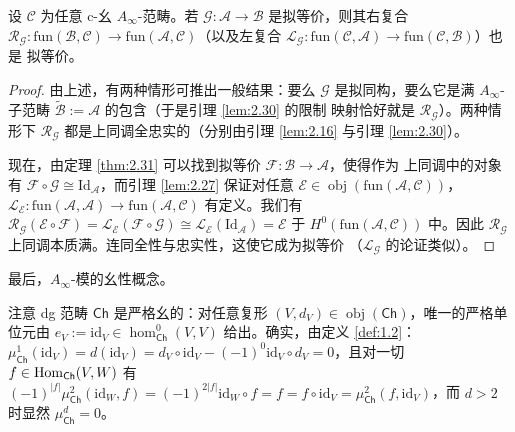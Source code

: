 \begin{Cor}\label{cor:2.32}
设 $\mathcal C$ 为任意 c-幺 $A_\infty$-范畴。若 $\mathcal G:\mathcal A\to\mathcal B$
是拟等价，则其右复合 $\mathcal R_{\mathcal G}:\mathrm{fun}(\mathcal B,\mathcal C)
\to\mathrm{fun}(\mathcal A,\mathcal C)$（以及左复合 $\mathcal L_{\mathcal G}:
\mathrm{fun}(\mathcal C,\mathcal A)\to\mathrm{fun}(\mathcal C,\mathcal B)$）也是
拟等价。
\end{Cor}

\begin{proof}
由上述，有两种情形可推出一般结果：要么 $\mathcal G$ 是拟同构，要么它是满
$A_\infty$-子范畴 $\tilde{\mathcal B}:=\mathcal A$ 的包含（于是引理 \ref{lem:2.30} 的限制
映射恰好就是 $\mathcal R_{\mathcal G}$）。两种情形下 $\mathcal R_{\mathcal G}$
都是上同调全忠实的（分别由引理 \ref{lem:2.16} 与引理 \ref{lem:2.30}）。

现在，由定理 \ref{thm:2.31} 可以找到拟等价 $\mathcal F:\mathcal B\to\mathcal A$，使得作为
上同调中的对象有 $\mathcal F\circ\mathcal G\cong\mathrm{Id}_{\mathcal A}$，而引理 \ref{lem:2.27} 保证对任意 $\mathcal E\in\operatorname{obj}(\mathrm{fun}(\mathcal A,
\mathcal C))$，$\mathcal L_{\mathcal E}:\mathrm{fun}(\mathcal A,\mathcal A)\to
\mathrm{fun}(\mathcal A,\mathcal C)$ 有定义。我们有
$\mathcal R_{\mathcal G}(\mathcal E\circ\mathcal F)=\mathcal L_{\mathcal E}
(\mathcal F\circ\mathcal G)\cong\mathcal L_{\mathcal E}(\mathrm{Id}_{\mathcal A})
=\mathcal E$ 于 $H^0(\mathrm{fun}(\mathcal A,\mathcal C))$ 中。因此
$\mathcal R_{\mathcal G}$ 上同调本质满。连同全性与忠实性，这使它成为拟等价
（$\mathcal L_{\mathcal G}$ 的论证类似）。
\end{proof}

最后，$A_\infty$-模的幺性概念。

\begin{Rem}\label{rem:2.33}
注意 dg 范畴 $\mathsf{Ch}$ 是严格幺的：对任意复形 $(V,d_V)\in\operatorname{obj}
(\mathsf{Ch})$，唯一的严格单位元由 $e_V:=\mathrm{id}_V\in\hom^0_{\mathsf{Ch}}
(V,V)$ 给出。确实，由定义 \ref{def:1.2}：
$\mu^1_{\mathsf{Ch}}(\mathrm{id}_V)=d(\mathrm{id}_V)=d_V\circ\mathrm{id}_V
-(-1)^0\mathrm{id}_V\circ d_V=0$，且对一切 $f\in\operatorname{Hom}_{\mathsf{Ch}}(V,W)$ 有
$(-1)^{|f|}\mu^2_{\mathsf{Ch}}(\mathrm{id}_W,f)=(-1)^{2|f|}\mathrm{id}_W\circ f
=f=f\circ\mathrm{id}_V=\mu^2_{\mathsf{Ch}}(f,\mathrm{id}_V)$，而 $d>2$ 时显然
$\mu^d_{\mathsf{Ch}}=0$。
\end{Rem}

